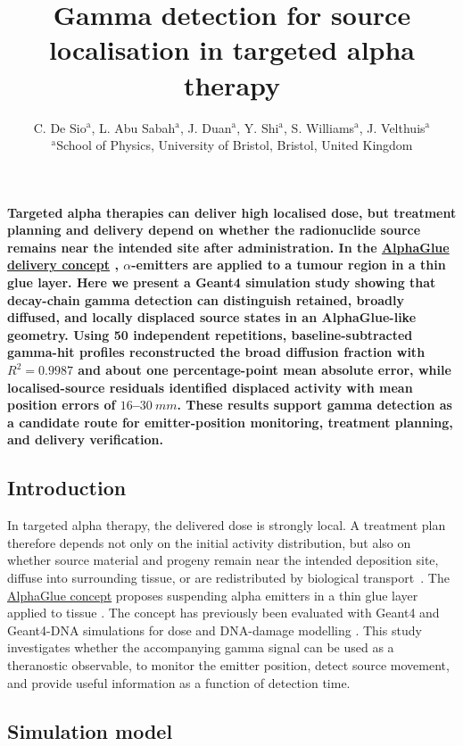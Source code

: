 \documentclass[10pt,twocolumn]{article}
\title{Gamma detection for source localisation in targeted alpha therapy}
\author{
C. De Sio$^{\text{a}}$,
L. Abu Sabah$^{\text{a}}$,
J. Duan$^{\text{a}}$,
Y. Shi$^{\text{a}}$,
S. Williams$^{\text{a}}$,
J. Velthuis$^{\text{a}}$\\
\vspace{0.3em}
\small $^{\text{a}}$School of Physics, University of Bristol, Bristol, United Kingdom
}
\date{}
\makeatletter
\renewcommand{\maketitle}{
\twocolumn[
  \begin{center}
    {\LARGE \@title \par}
    \vspace{0.5em}
    {\normalsize \@author \par}
    \vspace{1em}
  \end{center}
]
}
\makeatother
\begin{document}
\maketitle

\textbf{
Targeted alpha therapies can deliver high localised dose, but treatment
planning and delivery depend on whether the radionuclide source remains near
the intended site after administration.  In the
\href{https://doi.org/10.3390/biomedinformatics5040058}{AlphaGlue delivery concept}
\cite{AlphaGlue2025}, \(\alpha\)-emitters are applied to a tumour region in a
thin glue layer.  Here we present a Geant4 simulation study showing that
decay-chain gamma detection can distinguish retained, broadly diffused, and
locally displaced source states in an AlphaGlue-like geometry.  Using 50
independent repetitions, baseline-subtracted gamma-hit profiles
reconstructed the broad diffusion fraction with \(R^2=0.9987\) and about one
percentage-point mean absolute error, while localised-source residuals
identified displaced activity with mean position errors of
\(16\)--\(\SI{30}{mm}\).  These results support gamma detection as a
candidate route for emitter-position monitoring, treatment planning, and
delivery verification.
}

\subsection*{Introduction}

In targeted alpha therapy, the delivered dose is strongly local.  A treatment
plan therefore depends not only on the initial activity distribution, but also
on whether source material and progeny remain near the intended deposition
site, diffuse into surrounding tissue, or are redistributed by biological
transport~\cite{laura,heger}.  The
\href{https://doi.org/10.3390/biomedinformatics5040058}{AlphaGlue concept}
proposes suspending alpha emitters in a thin glue layer applied to tissue
\cite{AlphaGlue2025}.  The concept has previously been evaluated with
Geant4 and Geant4-DNA simulations for dose and DNA-damage modelling
\cite{Geant4,Geant4DNA}.  This study investigates whether the accompanying
gamma signal can be used as a theranostic observable, to monitor the emitter
position, detect source movement, and provide useful information as a
function of detection time.

\subsection*{Simulation model}
\end{document}
